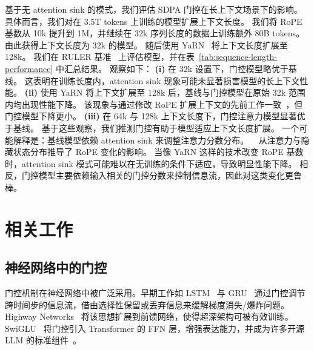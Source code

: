 \documentclass{article} %
\begin{document}
基于无 attention sink 的模式，我们评估 SDPA 门控在长上下文场景下的影响。
具体而言，我们对在 3.5T tokens 上训练的模型扩展上下文长度。
我们将 RoPE~\citep{su2024roformer} 基数从 10k 提升到 1M，并继续在 32k 序列长度的数据上训练额外 80B tokens。
由此获得上下文长度为 32k 的模型。
随后使用 YaRN~\citep{peng2023yarn} 将上下文长度扩展至 128k。
我们在 RULER 基准~\citep{hsieh2024ruler} 上评估模型，并在表~\ref{tab:sequence-length-performance} 中汇总结果。
观察如下：
\textbf{(i)} 在 32k 设置下，门控模型略优于基线。
这表明在训练长度内，attention sink 现象可能未显著损害模型的长上下文性能。
\textbf{(ii)} 使用 YaRN 将上下文扩展至 128k 后，基线与门控模型在原始 32k 范围内均出现性能下降。
该现象与通过修改 RoPE 扩展上下文的先前工作一致~\citep{chen2023extendingcontextwindowlarge,peng2023yarn,Dong2025LongReDMS}，但门控模型下降更小。
\textbf{(iii)} 在 64k 与 128k 上下文长度下，门控注意力模型显著优于基线。
基于这些观察，我们推测门控有助于模型适应上下文长度扩展。
一个可能解释是：基线模型依赖 attention sink 来调整注意力分数分布。
~\citet{Dong2025LongReDMS} 从注意力与隐藏状态分布推导了 RoPE 变化的影响。
当像 YaRN 这样的技术改变 RoPE 基数时，attention sink 模式可能难以在无训练的条件下适应，导致明显性能下降。
相反，门控模型主要依赖输入相关的门控分数来控制信息流，因此对这类变化更鲁棒。


\section{相关工作}

\subsection{神经网络中的门控}

门控机制在神经网络中被广泛采用。早期工作如 LSTM~\citep{hochreiter1997long} 与 GRU~\citep{dey2017gate} 通过门控调节跨时间步的信息流，借由选择性保留或丢弃信息来缓解梯度消失/爆炸问题。
Highway Networks~\citep{srivastava2015highway} 将该思想扩展到前馈网络，使得超深架构可被有效训练。
SwiGLU~\citep{shazeer2020glu} 将门控引入 Transformer 的 FFN 层，增强表达能力，并成为许多开源 LLM 的标准组件~\citep{grattafiori2024llama, yang2024qwen2}。
\end{document}
